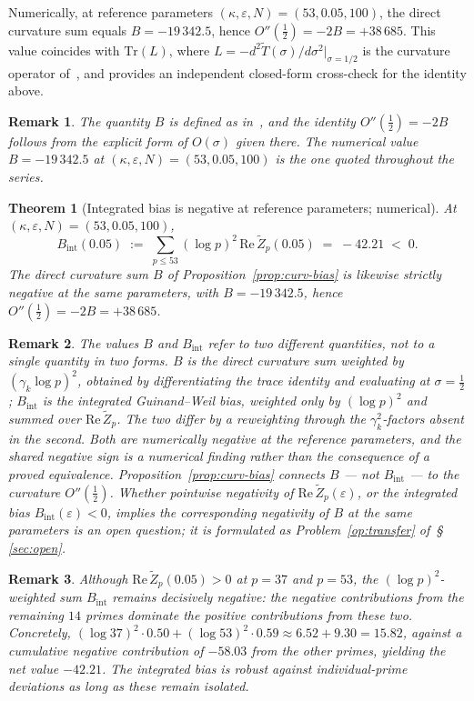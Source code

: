 \documentclass[11pt]{article}
\newtheorem{theorem}{Theorem}[section]
\newtheorem*{remark}{Remark}
\newcommand{\Tt}{\widetilde{T}}
\newcommand{\Zt}{\widetilde{Z}}
\begin{document}
Numerically, at reference parameters $(\kappa,\varepsilon,N)=(53,0.05,100)$,
the direct curvature sum equals $B=-19\,342.5$, hence
$O''(\tfrac12)=-2B=+38\,685$.
This value coincides with $\mathrm{Tr}(L)$, where
$L=-d^2\Tt(\sigma)/d\sigma^2\big|_{\sigma=1/2}$ is the curvature
operator of~\cite{Paper5}, and provides an independent closed-form
cross-check for the identity above.

\begin{remark}
The quantity $B$ is defined as in~\cite[\S5]{Paper5}, and the identity
$O''(\tfrac12)=-2B$ follows from the explicit form of $O(\sigma)$
given there.
The numerical value $B=-19\,342.5$ at $(\kappa,\varepsilon,N)=(53,0.05,100)$
is the one quoted throughout the series.
\end{remark}

\begin{theorem}[Integrated bias is negative at reference parameters; numerical]
\label{thm:intbias}
At $(\kappa,\varepsilon,N)=(53,0.05,100)$,
\[
B_{\mathrm{int}}(0.05) \;:=\; \sum_{p\le 53}(\log p)^2\,
\mathrm{Re}\,\Zt_p(0.05) \;=\; -42.21 \;<\; 0.
\]
The direct curvature sum $B$ of Proposition~\ref{prop:curv-bias} is
likewise strictly negative at the same parameters, with
$B=-19\,342.5$, hence $O''(\tfrac12)=-2B=+38\,685$.
\end{theorem}

\begin{remark}
The values $B$ and $B_{\mathrm{int}}$ refer to two \emph{different}
quantities, not to a single quantity in two forms.
$B$ is the direct curvature sum weighted by $(\gamma_k\log p)^2$,
obtained by differentiating the trace identity and evaluating at
$\sigma=\tfrac12$; $B_{\mathrm{int}}$ is the integrated Guinand--Weil
bias, weighted only by $(\log p)^2$ and summed over
$\mathrm{Re}\,\Zt_p$.
The two differ by a reweighting through the $\gamma_k^2$-factors
absent in the second.
Both are numerically negative at the reference parameters, and the
shared negative sign is a numerical finding rather than the consequence
of a proved equivalence.
Proposition~\ref{prop:curv-bias} connects $B$ --- not $B_{\mathrm{int}}$
--- to the curvature $O''(\tfrac12)$.
Whether pointwise negativity of $\mathrm{Re}\,\Zt_p(\varepsilon)$, or
the integrated bias $B_{\mathrm{int}}(\varepsilon)<0$, implies the
corresponding negativity of $B$ at the same parameters is an open
question; it is formulated as Problem~\ref{op:transfer} of~\S\,\ref{sec:open}.
\end{remark}

\begin{remark}
Although $\mathrm{Re}\,\Zt_p(0.05)>0$ at $p=37$ and $p=53$, the
$(\log p)^2$-weighted sum $B_{\mathrm{int}}$ remains decisively
negative: the negative contributions from the remaining $14$ primes
dominate the positive contributions from these two.
Concretely, $(\log 37)^2\cdot 0.50+(\log 53)^2\cdot 0.59\approx
6.52+9.30=15.82$, against a cumulative negative contribution of
$-58.03$ from the other primes, yielding the net value $-42.21$.
The integrated bias is robust against individual-prime deviations as
long as these remain isolated.
\end{remark}
\end{document}

